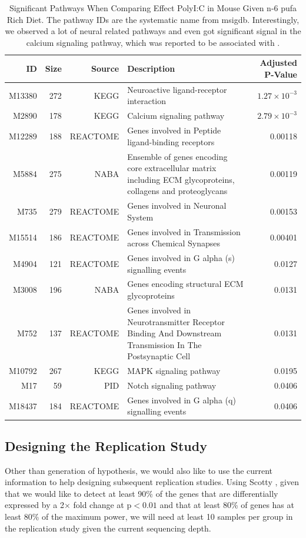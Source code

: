 \begin{landscape}
	\begin{table}
		\begin{tabular}{rrrp{10cm}r}
			\toprule
			ID&	Size&	Source&	Description&	Adjusted P-Value\\
			\midrule
			M13380&	272&	KEGG&	Neuroactive ligand-receptor interaction&	$1.27\times10^{-3}$\\
			M2890&	178&	KEGG&	Calcium signaling pathway&	$2.79\times10^{-3}$\\
			M12289&	188&	REACTOME&	Genes involved in Peptide ligand-binding receptors&	0.00118\\
			M5884&	275&	NABA&	Ensemble of genes encoding core extracellular matrix including ECM glycoproteins, collagens and proteoglycans&	0.00119\\
			M735&	279&	REACTOME&	Genes involved in Neuronal System&	0.00153\\
			M15514&	186&	REACTOME&	Genes involved in Transmission across Chemical Synapses&	0.00401\\
			M4904&	121&	REACTOME&	Genes involved in G alpha (s) signalling events&	0.0127\\
			M3008&	196&	NABA&	Genes encoding structural ECM glycoproteins&	0.0131\\
			M752&	137&	REACTOME&	Genes involved in Neurotransmitter Receptor Binding And Downstream Transmission In The Postsynaptic Cell&	0.0131\\
			M10792&	267&	KEGG&	MAPK signaling pathway&	0.0195\\
			M17&	59&	PID&	Notch signaling pathway&	0.0406\\
			M18437&	184&	REACTOME&	Genes involved in G alpha (q) signalling events&	0.0406\\
			\bottomrule
		\end{tabular}
		\caption[Significant Pathways When Comparing Effect PolyI:C in Mouse Given n-6 \gls{pufa} Rich Diet]{Significant Pathways When Comparing Effect PolyI:C in Mouse Given n-6 \gls{pufa} Rich Diet.
			The pathway IDs are the systematic name from \gls{msigdb}.
			Interestingly, we observed a lot of neural related pathways and even got significant signal in the calcium signaling pathway, which was reported to be associated with  \citep{Purcell2014}. 
		}
		\label{tab:miaPath}
	\end{table}
\end{landscape}
\subsection{Designing the Replication Study}
Other than generation of hypothesis, we would also like to use the current information to help designing subsequent replication studies.
Using Scotty \citep{Busby2013}, given that we would like to detect at least 90\% of the genes that are differentially expressed by a 2$\times$ fold change at p$<0.01$ and that at least 80\% of genes has at least 80\% of the maximum power, we will need at least 10 samples per group in the replication study given the current sequencing depth.

